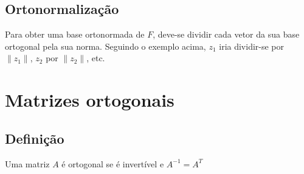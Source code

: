 \documentclass[10pt,a4paper]{report}
\begin{document}
\subsection{Ortonormalização}
Para obter uma base ortonormada de $F$, deve-se dividir cada vetor da sua base ortogonal pela sua norma. Seguindo o exemplo acima, $z_1$ iria dividir-se por $\|z_1\|$, $z_2$ por $\|z_2\|$, etc.

\section{Matrizes ortogonais}
\subsection{Definição}
Uma matriz $A$ é ortogonal se é invertível e $A^{-1} = A^T$
\end{document}
